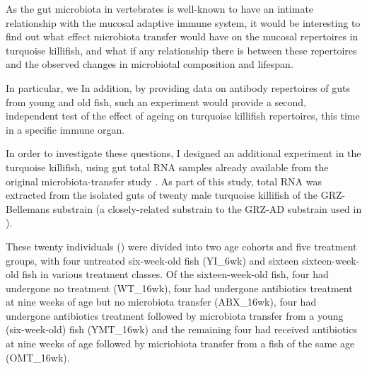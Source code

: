 















 As the gut microbiota in vertebrates is well-known to have an intimate relationship with the mucosal adaptive immune system, %
it would be interesting to find out what effect microbiota transfer would have on the mucosal repertoires in turquoise killifish, and what if any relationship there is between these repertoires and the observed changes in microbiotal composition and lifespan. 

In particular, we  In addition, by providing data on antibody repertoires of guts from young and old fish, such an experiment would provide a second, independent test of the effect of ageing on turquoise killifish repertoires, this time in a specific immune organ.

In order to investigate these questions, I designed an additional \igseq experiment in the turquoise killifish, using gut total RNA samples already available from the original microbiota-transfer study \parencite{smith2017microbiota}. 
As part of this study, total RNA was extracted from the isolated guts of twenty male turquoise killifish of the GRZ-Bellemans substrain (a closely-related substrain to the GRZ-AD substrain used in ). 

These twenty individuals () were divided into two age cohorts and five treatment groups, with four untreated six-week-old fish (YI\_6wk) and sixteen sixteen-week-old fish in various treatment classes. Of the sixteen-week-old fish, four had undergone no treatment (WT\_16wk), four had undergone antibiotics treatment at nine weeks of age but no microbiota transfer (ABX\_16wk), four had undergone antibiotics treatment followed by microbiota transfer from a young (six-week-old) fish (YMT\_16wk) and the remaining four had received antibiotics at nine weeks of age followed by micriobiota transfer from a fish of the same age (OMT\_16wk).



